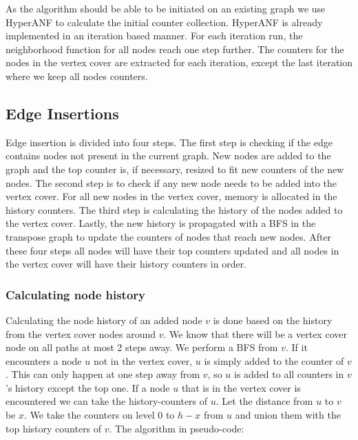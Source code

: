 
As the algorithm should be able to be initiated on an existing graph we use HyperANF to calculate the initial counter collection. HyperANF is already implemented in an iteration based manner. For each iteration run, the neighborhood function for all nodes reach one step further. The counters for the nodes in the vertex cover are extracted for each iteration, except the last iteration where we keep all nodes counters. 

\subsection{Edge Insertions}

Edge insertion is divided into four steps. The first step is checking if the edge contains nodes not present in the current graph. New nodes are added to the graph and the top counter is, if necessary, resized to fit new counters of the new nodes. The second step is to check if any new node needs to be added into the vertex cover. For all new nodes in the vertex cover, memory is allocated in the history counters. The third step is calculating the history of the nodes added to the vertex cover. Lastly, the new history is propagated with a BFS in the transpose graph to update the counters of nodes that reach new nodes. After these four steps all nodes will have their top counters updated and all nodes in the vertex cover will have their history counters in order. 

\subsubsection{Calculating node history}

Calculating the node history of an added node $v$ is done based on the history from the vertex cover nodes around $v$. We know that there will be a vertex cover node on all paths at most 2 steps away. We perform a BFS from $v$. If it encounters a node $u$ not in the vertex cover, $u$ is simply added to the counter of $v$. This can only happen at one step away from $v$, so $u$ is added to all counters in $v$'s history except the top one. If a node $u$ that is in the vertex cover is encountered we can take the history-counters of $u$. Let the distance from $u$ to $v$ be $x$. We take the counters on level $0$ to $h-x$ from $u$ and union them with the top history counters of $v$.   The algorithm in pseudo-code:

